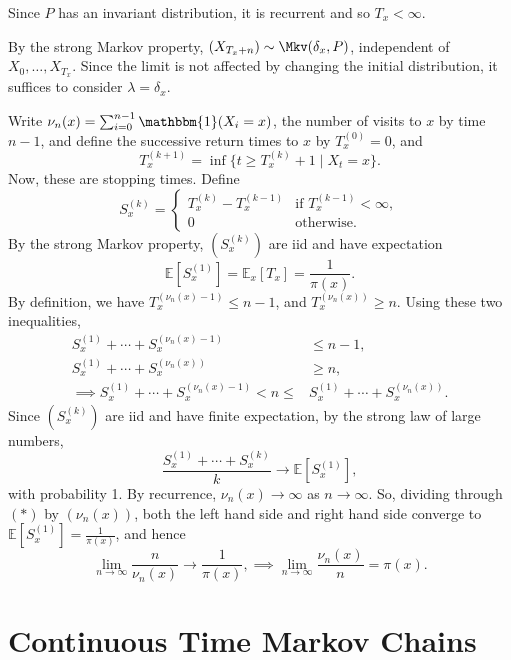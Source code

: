 \documentclass[12pt]{article}
\begin{document}
\begin{proofbox}
	Since $P$ has an invariant distribution, it is recurrent and so $T_x < \infty$.

	By the strong Markov property, $(X_{T_x + n}) \sim \Mkv(\delta_x, P)$, independent of $X_0, \ldots, X_{T_x}$. Since the limit is not affected by changing the initial distribution, it suffices to consider $\lambda = \delta_x$.

	Write $\nu_n(x) = \sum_{i = 0}^{n-1} \mathbbm{1}(X_i = x)$, the number of visits to $x$ by time $n-1$, and define the successive return times to $x$ by $T_x^{(0)} = 0$, and
	\[
		T_x^{(k+1)} = \inf\{t \geq T_x^{(k)} + 1 \mid X_t = x\}
	.\]
	Now, these are stopping times. Define
	\[
		S_x^{(k)} =
		\begin{cases}
			T_x^{(k)} - T_x^{(k-1)} & \text{if } T_x^{(k-1)} < \infty, \\
			0 & \text{otherwise}.
		\end{cases}
	\]
	By the strong Markov property, $(S_x^{(k)})$ are iid and have expectation
	\[
		\mathbb{E}[S_x^{(1)}] = \mathbb{E}_x[T_x] = \frac{1}{\pi(x)}
	.\]
	By definition, we have $T_x^{(\nu_n(x) - 1)} \leq n-1$, and $T_x^{(\nu_n(x))} \geq n$. Using these two inequalities,
	\begin{align*}
		S_x^{(1)} + \cdots + S_x^{(\nu_n(x) - 1)} &\leq n-1, \\
		S_x^{(1)} + \cdots + S_x^{(\nu_n(x))} &\geq n, \\
		\implies S_x^{(1)} + \cdots + S_x^{(\nu_n(x) - 1)} < n \leq &S_x^{(1)} + \cdots + S_x^{(\nu_n(x))}. \tag{$\ast$}
	\end{align*}
	Since $(S_x^{(k)})$ are iid and have finite expectation, by the strong law of large numbers,
	\[
		\frac{S_x^{(1)} + \cdots + S_x^{(k)}}{k} \to \mathbb{E}[S_x^{(1)}]
	,\]
	with probability 1. By recurrence, $\nu_n(x) \to \infty$ as $n \to \infty$. So, dividing through $(\ast)$ by $(\nu_n(x))$, both the left hand side and right hand side converge to $\mathbb{E}[S_x^{(1)}] = \frac{1}{\pi(x)}$, and hence
	\[
		\lim_{n \to \infty} \frac{n}{\nu_n(x)} \to \frac{1}{\pi(x)}, \implies \lim_{n \to \infty} \frac{\nu_n(x)}{n} = \pi(x)
	.\]
\end{proofbox}

\newpage

\section{Continuous Time Markov Chains}%
\label{sec:continuous_time_markov_chains}
\end{document}
